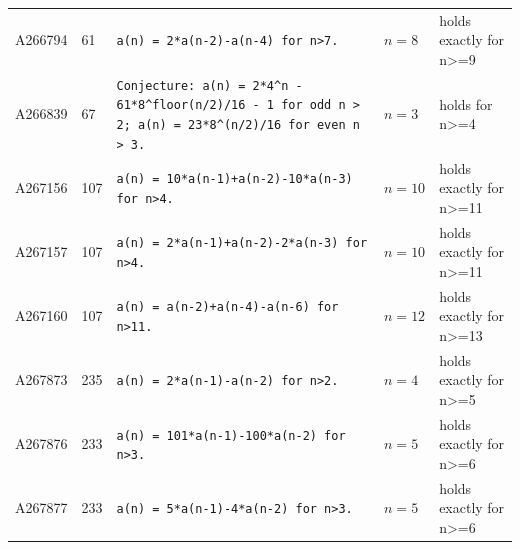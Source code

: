 \documentclass[11pt]{article}
\theoremstyle{definition}
\theoremstyle{remark}
\begin{document}
\begin{longtable}{p{1.4cm}p{0.8cm}p{6.3cm}p{1.4cm}p{4cm}}
A266794 & 61 & \texttt{a(n)\allowbreak{} \allowbreak{}=\allowbreak{} \allowbreak{}2*\allowbreak{}a(n-\allowbreak{}2)\allowbreak{}-\allowbreak{}a(n-\allowbreak{}4)\allowbreak{} \allowbreak{}for \allowbreak{}n>7.} & $n=8$ & holds exactly for n>=9 \\
A266839 & 67 & \texttt{Conjecture: \allowbreak{}a(n)\allowbreak{} \allowbreak{}=\allowbreak{} \allowbreak{}2*\allowbreak{}4\^{}n \allowbreak{}-\allowbreak{} \allowbreak{}61*\allowbreak{}8\^{}floor(n/\allowbreak{}2)\allowbreak{}/\allowbreak{}16 \allowbreak{}-\allowbreak{} \allowbreak{}1 \allowbreak{}for \allowbreak{}odd \allowbreak{}n \allowbreak{}> \allowbreak{}2; \allowbreak{}a(n)\allowbreak{} \allowbreak{}=\allowbreak{} \allowbreak{}23*\allowbreak{}8\^{}(n/\allowbreak{}2)\allowbreak{}/\allowbreak{}16 \allowbreak{}for \allowbreak{}even \allowbreak{}n \allowbreak{}> \allowbreak{}3.} & $n=3$ & holds for n>=4 \\
A267156 & 107 & \texttt{a(n)\allowbreak{} \allowbreak{}=\allowbreak{} \allowbreak{}10*\allowbreak{}a(n-\allowbreak{}1)\allowbreak{}+\allowbreak{}a(n-\allowbreak{}2)\allowbreak{}-\allowbreak{}10*\allowbreak{}a(n-\allowbreak{}3)\allowbreak{} \allowbreak{}for \allowbreak{}n>4.} & $n=10$ & holds exactly for n>=11 \\
A267157 & 107 & \texttt{a(n)\allowbreak{} \allowbreak{}=\allowbreak{} \allowbreak{}2*\allowbreak{}a(n-\allowbreak{}1)\allowbreak{}+\allowbreak{}a(n-\allowbreak{}2)\allowbreak{}-\allowbreak{}2*\allowbreak{}a(n-\allowbreak{}3)\allowbreak{} \allowbreak{}for \allowbreak{}n>4.} & $n=10$ & holds exactly for n>=11 \\
A267160 & 107 & \texttt{a(n)\allowbreak{} \allowbreak{}=\allowbreak{} \allowbreak{}a(n-\allowbreak{}2)\allowbreak{}+\allowbreak{}a(n-\allowbreak{}4)\allowbreak{}-\allowbreak{}a(n-\allowbreak{}6)\allowbreak{} \allowbreak{}for \allowbreak{}n>11.} & $n=12$ & holds exactly for n>=13 \\
A267873 & 235 & \texttt{a(n)\allowbreak{} \allowbreak{}=\allowbreak{} \allowbreak{}2*\allowbreak{}a(n-\allowbreak{}1)\allowbreak{}-\allowbreak{}a(n-\allowbreak{}2)\allowbreak{} \allowbreak{}for \allowbreak{}n>2.} & $n=4$ & holds exactly for n>=5 \\
A267876 & 233 & \texttt{a(n)\allowbreak{} \allowbreak{}=\allowbreak{} \allowbreak{}101*\allowbreak{}a(n-\allowbreak{}1)\allowbreak{}-\allowbreak{}100*\allowbreak{}a(n-\allowbreak{}2)\allowbreak{} \allowbreak{}for \allowbreak{}n>3.} & $n=5$ & holds exactly for n>=6 \\
A267877 & 233 & \texttt{a(n)\allowbreak{} \allowbreak{}=\allowbreak{} \allowbreak{}5*\allowbreak{}a(n-\allowbreak{}1)\allowbreak{}-\allowbreak{}4*\allowbreak{}a(n-\allowbreak{}2)\allowbreak{} \allowbreak{}for \allowbreak{}n>3.} & $n=5$ & holds exactly for n>=6 \\

\end{longtable}
\end{document}
